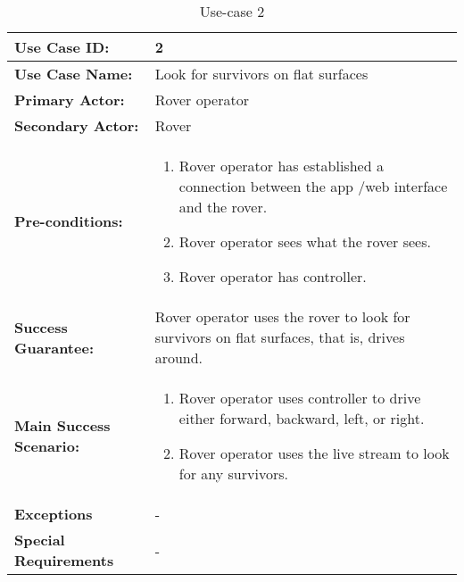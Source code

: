 \documentclass[12pt]{article}
\begin{document}
	 	\begin{table}[h]
	 		\centering
	 		\begin{tabularx}{\linewidth}{|X|X|}
	 			\hline
	 			\textbf{Use Case ID:} &2\\
	 			\hline
	 			\textbf{Use Case Name:} &Look for survivors on flat surfaces\\
	 			\hline
	 			\textbf{Primary Actor:} &Rover operator\\
	 			\hline
	 			\textbf{Secondary Actor:} &Rover\\
	 			\hline
	 			\textbf{Pre-conditions:} &\begin{enumerate}
	 				\item Rover operator has established a connection between the app /web interface and the rover.
	 				\item Rover operator sees what the rover sees.
	 				\item Rover operator has controller.
	 			\end{enumerate}\\
	 			\hline
	 			\textbf{Success Guarantee:} &
	 			Rover operator uses the rover to look for survivors on flat surfaces, that is, drives around. \\
	 			\hline 
	 			\textbf{Main Success Scenario:} &\begin{enumerate}
	 				\item Rover operator uses controller to drive either forward, backward, left, or right.
	 				\item Rover operator uses the live stream to look for any survivors.
	 			\end{enumerate}\\
	 			\hline
	 			\textbf{Exceptions} &-\\
	 			\hline
	 			\textbf{Special Requirements} &-\\
	 			\hline
	 		\end{tabularx}
	 		\caption{Use-case 2}
	 		\label{table:Use-case2}   
	 	\end{table}
\end{document}
